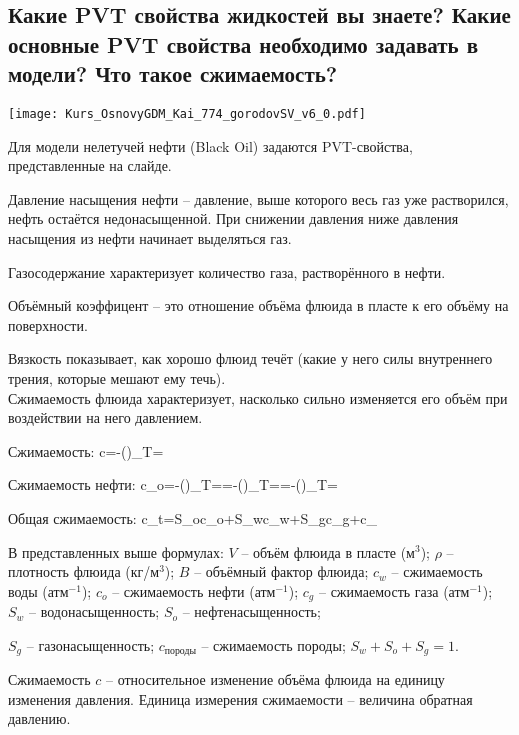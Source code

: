 

\subsection{Какие PVT свойства жидкостей вы знаете? Какие основные PVT свойства необходимо задавать в модели? Что такое сжимаемость?}

\texttt{[image: Kurs\_OsnovyGDM\_Kai\_774\_gorodovSV\_v6\_0.pdf]}

Для модели нелетучей нефти (Black Oil) задаются PVT-свойства, представленные на слайде.

Давление насыщения нефти -- давление, выше которого весь газ уже растворился, нефть остаётся недонасыщенной.
При снижении давления ниже давления насыщения из нефти начинает выделяться газ.

Газосодержание характеризует количество газа, растворённого в нефти.

Объёмный коэффицент -- это отношение объёма флюида в пласте к его объёму на поверхности.

Вязкость показывает, как хорошо флюид течёт (какие у него силы внутреннего трения, которые мешают ему течь).
\\

Сжимаемость флюида характеризует, насколько сильно изменяется его объём при воздействии на него давлением.

Сжимаемость:
\beq
c=-\left(\right)_{T=}
\eeq

Сжимаемость нефти:
\beq
c_o=-\left(\right)_{T=}=-\left(\right)_{T=}=-\left(\right)_{T=}
\eeq

Общая сжимаемость:
\beq
c_t=S_oc_o+S_wc_w+S_gc_g+c_{}
\eeq

В представленных выше формулах:
$V$ -- объём флюида в пласте (м$^3$);
$\rho$ -- плотность флюида (кг/м$^3$);
$B$ -- объёмный фактор флюида;
$c_w$ -- сжимаемость воды (атм$^{-1}$);
$c_o$ -- сжимаемость нефти (атм$^{-1}$);
$c_g$ -- сжимаемость газа (атм$^{-1}$);
$S_w$ -- водонасыщенность;
$S_o$ -- нефтенасыщенность;

$S_g$ -- газонасыщенность;
$c_\text{породы}$ -- сжимаемость породы;
$S_w+S_o+S_g=1$.

Сжимаемость $c$ -- относительное изменение объёма флюида на единицу изменения давления.
Единица измерения сжимаемости -- величина обратная давлению.
\\

